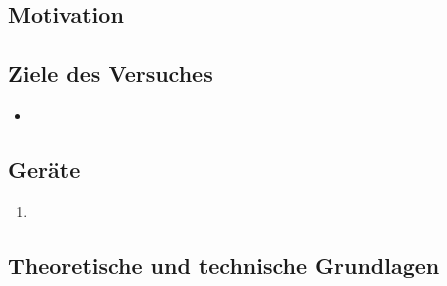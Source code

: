 \subsection{Motivation}

\subsection{Ziele des Versuches}

\begin{itemize}
    \item 
\end{itemize}

\subsection{Geräte}
\begin{enumerate}
    \item 
\end{enumerate}

\newpage

\subsection[Theoretische und technische Grundlagen]{Theoretische und technische Grundlagen \autocite{Skript_1}}



